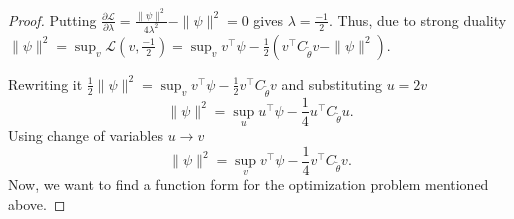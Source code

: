 \documentclass[10pt,a4paper]{amsart}
\def\gL{{\mathcal{L}}}
\begin{document}
\begin{proof}
    
    
    
    Putting $\frac{   \partial\gL}{\partial \lambda}= \frac{\|\psi\|^2}{4\lambda^2} -\|\psi\|^2=0$ gives $\lambda=\frac{-1}{2}.$ Thus, due to strong duality $\|\psi\|^2= \sup_{v} \gL(v,\frac{-1}{2})= \sup_{v} v^\top \psi-\frac{1}{2}(v^\top C_{\tilde{\theta}}v - \|\psi\|^2).$ 
    
    Rewriting it $\frac{1}{2}\|\psi\|^2= \sup_{v}   v^\top \psi-\frac{1}{2}v^\top C_{\tilde{\theta}}v$ and substituting $u=2v$
    \begin{equation*}
        \|\psi\|^2= \sup_{u}   u^\top \psi-\frac{1}{4}u^\top C_{\tilde{\theta}}u .
    \end{equation*}
    Using change of variables $u\rightarrow v$
       \begin{equation*}
        \|\psi\|^2= \sup_{v}   v^\top \psi-\frac{1}{4}v^\top C_{\tilde{\theta}}v.
    \end{equation*}
    Now, we want to find a function form for the optimization problem mentioned above.


\end{proof}
\end{document}
